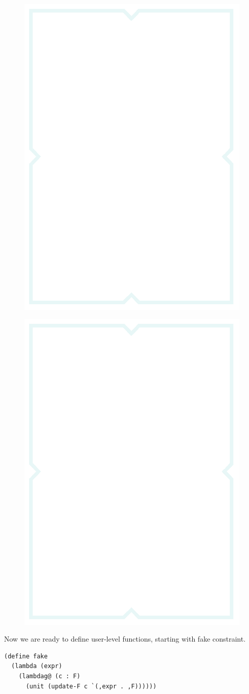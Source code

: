 \begin{figure}[h]
    \centering
    \begin{minipage}{.5\textwidth}
        \includegraphics[width=.5\textwidth]{figures/coverbg.png}
        \label{miniS}
    \end{minipage}%
    \begin{minipage}{.5\textwidth}
        \includegraphics[width=.5\textwidth]{figures/coverbg.png}
        \label{staticS}
    \end{minipage}
\end{figure}

Now we are ready to define user-level functions, starting with fake constraint.
\begin{lstlisting}
(define fake
  (lambda (expr)
    (lambdag@ (c : F)
      (unit (update-F c `(,expr . ,F))))))
\end{lstlisting}

